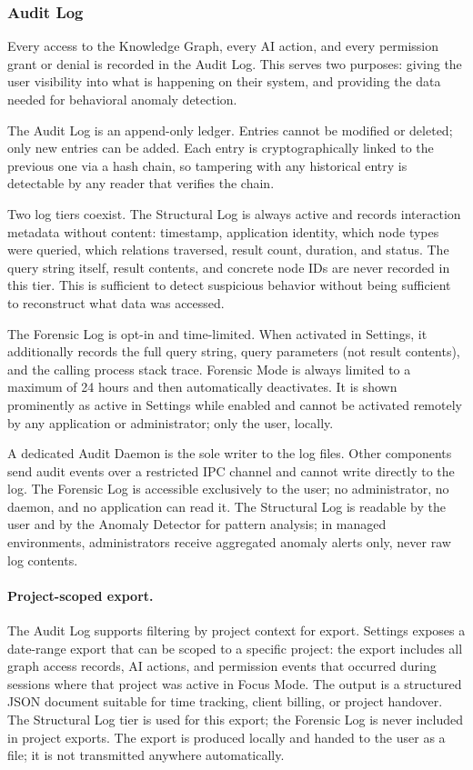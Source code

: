 \subsubsection{Audit Log}
\label{sec:audit-log}

Every access to the Knowledge Graph, every AI action, and every permission
grant or denial is recorded in the Audit Log. This serves two purposes:
giving the user visibility into what is happening on their system, and
providing the data needed for behavioral anomaly detection.

The Audit Log is an append-only ledger. Entries cannot be modified or deleted;
only new entries can be added. Each entry is cryptographically linked to the
previous one via a hash chain, so tampering with any historical entry is
detectable by any reader that verifies the chain.

Two log tiers coexist. The Structural Log is always active and records
interaction metadata without content: timestamp, application identity, which
node types were queried, which relations traversed, result count, duration,
and status. The query string itself, result contents, and concrete node IDs
are never recorded in this tier. This is sufficient to detect suspicious
behavior without being sufficient to reconstruct what data was accessed.

The Forensic Log is opt-in and time-limited. When activated in Settings, it
additionally records the full query string, query parameters (not result
contents), and the calling process stack trace. Forensic Mode is always
limited to a maximum of 24 hours and then automatically deactivates. It is
shown prominently as active in Settings while enabled and cannot be activated
remotely by any application or administrator; only the user, locally.

A dedicated Audit Daemon is the sole writer to the log files. Other components
send audit events over a restricted IPC channel and cannot write directly to
the log. The Forensic Log is accessible exclusively to the user; no
administrator, no daemon, and no application can read it. The Structural Log
is readable by the user and by the Anomaly Detector for pattern analysis;
in managed environments, administrators receive aggregated anomaly alerts only,
never raw log contents.

\paragraph{Project-scoped export.}
The Audit Log supports filtering by project context for export. Settings
exposes a date-range export that can be scoped to a specific project: the
export includes all graph access records, AI actions, and permission events
that occurred during sessions where that project was active in Focus Mode.
The output is a structured JSON document suitable for time tracking,
client billing, or project handover. The Structural Log tier is used for
this export; the Forensic Log is never included in project exports. The
export is produced locally and handed to the user as a file; it is not
transmitted anywhere automatically.

